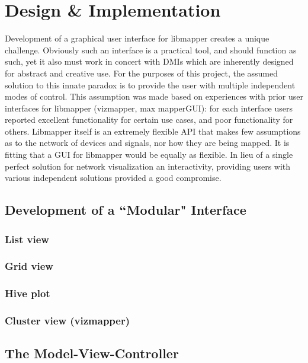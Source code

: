 \chapter{Design \& Implementation}

	Development of a graphical user interface for libmapper creates a unique challenge. Obviously such an interface is a practical tool, and should function as such, yet it also must work in concert with DMIs which are inherently designed for abstract and creative use. For the purposes of this project, the assumed solution to this innate paradox is to provide the user with multiple independent modes of control.  This assumption was made based on experiences with prior user interfaces for libmapper (vizmapper, max mapperGUI): for each interface users reported excellent functionality for certain use cases, and poor functionality for others. Libmapper itself is an extremely flexible API that makes few assumptions as to the network of devices and signals, nor how they are being mapped. It is fitting that a GUI for libmapper would be equally as flexible. In lieu of a single perfect solution for network visualization an interactivity, providing users with various independent solutions provided a good compromise.
	

\section{Development of a ``Modular" Interface}
	

\subsection{List view}
\label{sec:list_view}
\subsection{Grid view}
\subsection{Hive plot}
\subsection{Cluster view (vizmapper)}

\section{The Model-View-Controller}

